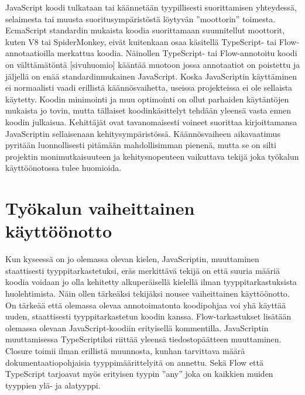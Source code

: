 JavaScript koodi tulkataan tai käännetään tyypillisesti suorittamisen
yhteydessä, selaimesta tai muusta suoritusympäristöstä löytyvän ”moottorin”
toimesta. EcmaScript standardin mukaista koodia suorittamaan suunnitellut
moottorit, kuten V8 tai SpiderMonkey, eivät kuitenkaan osaa käsitellä
TypeScript- tai Flow-annotaatioilla merkattua koodia. Näinollen TypeScript-
tai Flow-annotoitu koodi on välttämätöntä [sivuhuomio] kääntää muotoon jossa
annotaatiot on poistettu ja jäljellä on enää standardinmukainen JavaScript.
Koska JavaScriptin käyttäminen ei normaalisti vaadi erillistä
käännösvaihetta, useissa projekteissa ei ole sellaista käytetty. Koodin
minimointi ja muu optimointi on ollut parhaiden käytäntöjen mukaista jo
tovin, mutta tällaiset koodinkäsittelyt tehdään yleensä vasta ennen koodin
julkaisua. Kehittäjät ovat tavanomaisesti voineet suorittaa kirjoittamansa
JavaScriptin sellaisenaan kehitysympäristössä. Käännösvaiheen aikavaatimus
pyritään luonnollisesti pitämään mahdollisimman pienenä, mutta se on silti
projektin monimutkaisuuteen ja kehitysnopeuteen vaikuttava tekijä joka
työkalun käyttöönotossa tulee huomioida.

\section{Työkalun vaiheittainen käyttöönotto}

Kun kyseessä on jo olemassa olevan kielen, JavaScriptin, muuttaminen
staattisesti tyyppitarkastetuksi, eräs merkittävä tekijä on että suuria
määriä koodia voidaan jo olla kehitetty alkuperäisellä kielellä ilman
tyyppitarkastuksista huolehtimista. Näin ollen tärkeäksi tekijäksi nousee
vaiheittainen käyttöönotto. On tärkeää että olemassa olevaa annotoimatonta
koodipohjaa voi yhä käyttää uuden, staattisesti tyyppitarkastetun koodin
kanssa. Flow-tarkastukset lisätään olemassa olevaan JavaScript-koodiin
erityisellä kommentilla. JavaScriptin muuttamisessa TypeScriptiksi riittää
yleensä tiedostopäätteen muuttaminen. Closure toimii ilman erillistä
muunnosta, kunhan tarvittava määrä dokumentaatiopohjaisia tyyppimäärittelyitä
on annettu. Sekä Flow että TypeScript tarjoavat myös erityisen tyypin ”any”
joka on kaikkien muiden tyyppien ylä- ja alatyyppi.